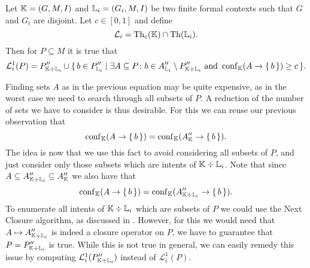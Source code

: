\begin{Proposition}
  \label{prop:computing-confident-closure-first-try}
  Let ${\mathbb{K}} = (G, M, I)$ and ${\mathbb{L}}_{i} = (G_{i}, M, I)$ be two finite formal contexts
  such that $G$ and $G_{i}$ are disjoint.  Let $c \in [0,1]$ and define
  \begin{equation*}
    \mathcal{L}_{i} = \operatorname{Th}_{c}({\mathbb{K}}) \cap \operatorname{Th}({\mathbb{L}}_{i}).
  \end{equation*}
  Then for $P \subseteq M$ it is true that
  \begin{equation*}
    \mathcal{L}_{i}^{1}(P) = P_{{\mathbb{K}} \div {\ensuremath{\mathbb{L}}}_{i}}'' \cup {\ensuremath{\{\, b \in P_{{\mathbb{L}}_{i}}'' \mid \exists A \subseteq P \colon b \in A_{{\mathbb{L}}_{i}}'' \setminus P_{{\mathbb{K}}
      \div {\ensuremath{\mathbb{L}}}_{i}}'' \text{ and } \operatorname{conf}_{{\mathbb{K}}}(A \to {\ensuremath{\{\, b \,\}}}) \ge c \,\}}}.
  \end{equation*}
\end{Proposition}

Finding sets $A$ as in the previous equation may be quite expensive, as in the worst case
we need to search through all subsets of $P$.  A reduction of the number of sets we have
to consider is thus desirable.  For this we can reuse our previous observation that
\begin{equation*}
  \operatorname{conf}_{{\mathbb{K}}}(A \to {\ensuremath{\{\, b \,\}}}) = \operatorname{conf}_{{\mathbb{K}}}(A_{{\mathbb{K}}}'' \to {\ensuremath{\{\, b \,\}}}).
\end{equation*}
The idea is now that we use this fact to avoid considering all subsets of $P$, and just
consider only those subsets which are intents of ${\mathbb{K}} \div {\ensuremath{\mathbb{L}}}_{i}$.  Note that
since $A \subseteq A_{{\mathbb{K}} \div {\ensuremath{\mathbb{L}}}_{i}}'' \subseteq A_{{\mathbb{K}}}''$ we also have that
\begin{equation*}
  \operatorname{conf}_{{\mathbb{K}}}(A \to {\ensuremath{\{\, b \,\}}}) = \operatorname{conf}_{{\mathbb{K}}}(A_{{\mathbb{K}} \div {\ensuremath{\mathbb{L}}}_{i}}'' \to {\ensuremath{\{\,
    b \,\}}}).
\end{equation*}
To enumerate all intents of ${\mathbb{K}} \div {\ensuremath{\mathbb{L}}}_{i}$ which are subsets of $P$ we could use
the Next Closure algorithm, as discussed in .  However, for
this we would need that $A \mapsto A_{{\mathbb{K}} \div {\ensuremath{\mathbb{L}}}_{i}}''$ is indeed a closure
operator on $P$, \ie we have to guarantee that $P = P_{{\mathbb{K}} \div {\ensuremath{\mathbb{L}}}_{i}}''$ is true.
While this is not true in general, we can easily remedy this issue by computing
$\mathcal{L}_{i}^{1}(P_{{\mathbb{K}} \div {\ensuremath{\mathbb{L}}}_{i}}'')$ instead of $\mathcal{L}_{i}^{1}(P)$.

